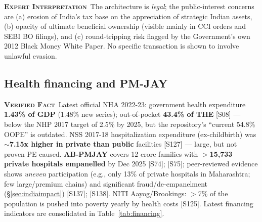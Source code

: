 \documentclass[11pt,a4paper]{article}
\newcommand{\VF}{\textcolor{vfcol}{\textsc{\textbf{Verified Fact}}}}
\newcommand{\EI}{\textcolor{eicol}{\textsc{\textbf{Expert Interpretation}}}}
\newcommand{\cs}[1]{\textnormal{[#1]}}
\begin{document}
\EI\ The architecture is \emph{legal}; the public-interest concerns are (a) erosion of India's tax base on the appreciation of strategic Indian assets, (b) opacity of ultimate beneficial ownership (visible mainly in CCI orders and SEBI BO filings), and (c) round-tripping risk flagged by the Government's own 2012 Black Money White Paper. No specific transaction is shown to involve unlawful evasion.

\subsection{Health financing and PM-JAY}

\VF\ Latest official NHA 2022-23: government health expenditure \textbf{1.43\% of GDP} (1.48\% new series); out-of-pocket \textbf{43.4\% of THE} \cs{S08} --- below the NHP 2017 target of 2.5\% by 2025, but the repository's ``current 54.8\% OOPE'' is outdated. NSS 2017-18 hospitalization expenditure (ex-childbirth) was \textbf{$\sim$7.15x higher in private than public} facilities \cs{S127} --- large, but not proven PE-caused. \textbf{AB-PMJAY} covers 12 crore families with \textbf{$>$15{,}733 private hospitals empanelled} by Dec 2025 \cs{S74}; \cs{S75}; peer-reviewed evidence shows \emph{uneven} participation (e.g., only 13\% of private hospitals in Maharashtra; few large/premium chains) and significant fraud/de-empanelment (\S\ref{sec:indiaimpact}) \cs{S137}; \cs{S138}. NITI Aayog/Brookings: $>$7\% of the population is pushed into poverty yearly by health costs \cs{S125}. Latest financing indicators are consolidated in Table~\ref{tab:financing}.
\end{document}
